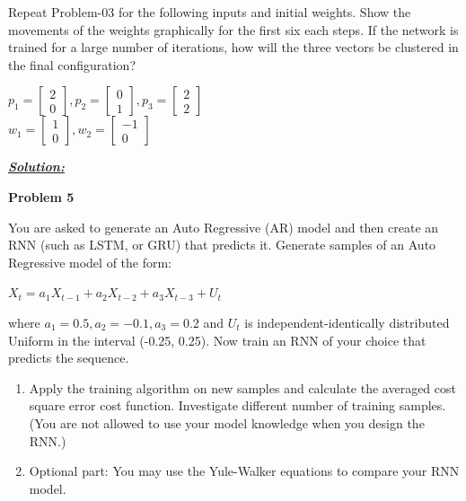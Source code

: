 \documentclass{article}
\begin{document}
\noindent Repeat Problem-03 for the following inputs and initial weights. Show the movements of 
the weights graphically for the first six each steps. If the network is trained for a large 
number of iterations, how will the three vectors be clustered in the final configuration?

\begin{center}
    $p_1 = \begin{bmatrix}
        2\\
        0
      \end{bmatrix}, p_2 = \begin{bmatrix}
        0\\
        1
      \end{bmatrix}, p_3 = \begin{bmatrix}
        2\\
        2
      \end{bmatrix}$\\
      \vspace{1cm}
      $w_1 = \begin{bmatrix}
        1\\
        0
      \end{bmatrix}, w_2 = \begin{bmatrix}
        -1\\
        0
      \end{bmatrix}$
      \vspace{1cm}

\end{center}

\noindent \underline{\textbf{\textit{Solution:}}}


\newpage
\noindent \textbf{Problem 5}

\noindent You are asked to generate an Auto Regressive (AR) model and then create an RNN (such 
as LSTM, or GRU) that predicts it. Generate samples of an Auto Regressive model of 
the form: 
\begin{center}
    $X_t = a_1X_{t-1} + a_2X_{t-2} + a_3X_{t-3} + U_t$
    
\end{center}
where $a_1= 0.5, a_2= -0.1, a_3= 0.2$ and $U_t$ is independent-identically distributed Uniform in 
the interval (-0.25, 0.25). Now train an RNN of your choice that predicts the sequence. 

\begin{enumerate} [label=\Alph*]
    \item Apply the training algorithm on new samples and calculate the averaged cost square 
    error cost function. Investigate different number of training samples. (You are not 
    allowed to use your model knowledge when you design the RNN.)
    \item Optional part: You may use the Yule-Walker equations to compare your RNN 
    model. 
    
\end{enumerate}
\end{document}
